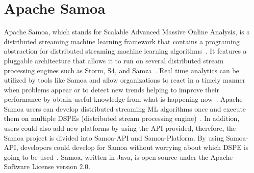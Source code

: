 \section{Apache Samoa}

Apache Samoa, which stands for Scalable Advanced Massive Online
Analysis, is a distributed streaming machine learning framework that
contains a programing abstraction for distributed streaming machine
learning algorithms~\cite{hid-sp18-405-www-samoa}. It features a
pluggable architecture that allows it to run on several distributed
stream processing engines such as Storm, S4, and
Samza~\cite{hid-sp18-405-www-samoa}. Real time analytics can be
utilized by tools like Samoa and allow organizations to react in a
timely manner when problems appear or to detect new trends helping to
improve their performance by obtain useful knowledge from what is
happening now~\cite{hid-sp18-405-bif2015mining-samoa}. Apache Samoa
users can develop distributed streaming ML algorithms once and execute
them on multiple DSPEs (distributed stream processing
engine)~\cite{hid-sp18-405-mor2015samoa-samoa}. In addition, users
could also add new platforms by using the API provided, therefore, the
Samoa project is divided into Samoa-API and Samoa-Platform. By using
Samoa-API, developers could develop for Samoa without worrying about
which DSPE is going to be used~\cite{hid-sp18-405-blog-samoa}. Samoa,
written in Java, is open source under the Apache Software License
version 2.0.

